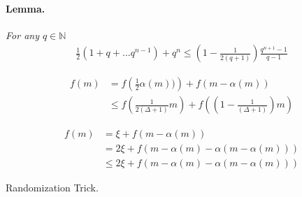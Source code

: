 \documentclass{article}
\newcommand{\Lemma}{\paragraph{Lemma.}}
\begin{document}
\begin{multicols*}{2}
\Lemma \textit{ For any \( q \in \mathbb{N}  \)    
\begin{equation*}
    \begin{split}
        \frac{1}{2}\left( 1 + q + ... q^{n-1} \right) + q^{n} \le \left( 1 - \frac{1}{2(q+1)} \right) \frac{q^{n+1}-1}{q-1} 
    \end{split}
\end{equation*}
}


\begin{equation*}
    \begin{split}
        f\left(m\right) &= f\left( \frac{1}{2}\alpha\left(m\right))  \right) + f\left( m - \alpha\left(m\right) \right)  \\
        & \le f\left( \frac{1}{2\left(\Delta+1\right)}m\right) + f\left( \left(1 - \frac{1}{\left( \Delta + 1 \right)} \right)m \right) 
    \end{split}
\end{equation*}

\begin{equation*}
    \begin{split}
        f\left(m\right) &= \xi + f\left( m - \alpha\left(m\right) \right)  \\
        & = 2\xi + f\left( m - \alpha\left(m\right) - \alpha\left(m - \alpha\left(m\right)\right)  \right) \\ & \le 2\xi + f\left( m - \alpha\left(m\right) - \alpha\left(m - \alpha\left(m\right)\right)  \right)
    \end{split}
\end{equation*}

Randomization Trick.




\end{multicols*}
\end{document}
